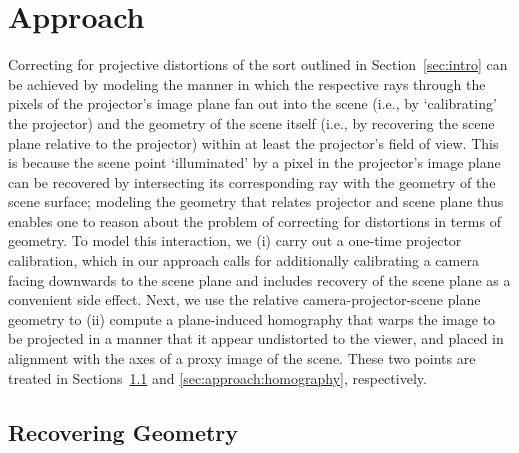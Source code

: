 \documentclass[review]{elsarticle}
\begin{document}

\section{Approach}

Correcting for projective distortions of the sort outlined in Section~\ref{sec:intro} can be achieved by modeling the manner in which the respective rays through the pixels of the projector's image plane fan out into the scene (i.e., by `calibrating' the projector) and the geometry of the scene itself (i.e., by recovering the scene plane relative to the projector) within at least the projector's field of view. This is because the scene point `illuminated' by a pixel in the projector's image plane can be recovered by intersecting its corresponding ray with the geometry of the scene surface; modeling the geometry that relates projector and scene plane thus enables one to reason about the problem of correcting for distortions in terms of geometry. To model this interaction, we (i) carry out a one-time projector calibration, which in our approach calls for additionally calibrating a camera facing downwards to the scene plane and includes recovery of the scene plane as a convenient side effect. Next, we use the relative camera-projector-scene plane geometry to (ii) compute a plane-induced homography that warps the image to be projected in a manner that it appear undistorted to the viewer, and placed in alignment with the axes of a proxy image of the scene. These two points are treated in Sections~\ref{sec:approach:geometry} and \ref{sec:approach:homography}, respectively.

\subsection{Recovering Geometry}\label{sec:approach:geometry}
\end{document}
